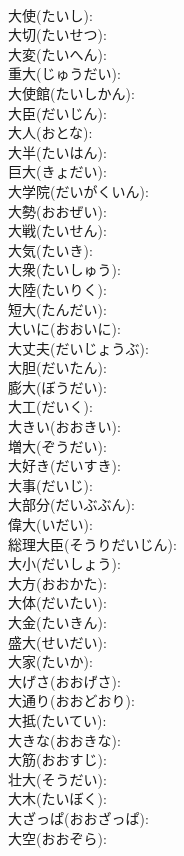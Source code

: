 \documentclass[8pt]{extreport}
\begin{document}
\begin{CJK}{UTF8}{min}
\\	大使(たいし): 
\\	大切(たいせつ): 
\\	大変(たいへん): 
\\	重大(じゅうだい): 
\\	大使館(たいしかん): 
\\	大臣(だいじん): 
\\	大人(おとな): 
\\	大半(たいはん): 
\\	巨大(きょだい): 
\\	大学院(だいがくいん): 
\\	大勢(おおぜい): 
\\	大戦(たいせん): 
\\	大気(たいき): 
\\	大衆(たいしゅう): 
\\	大陸(たいりく): 
\\	短大(たんだい): 
\\	大いに(おおいに): 
\\	大丈夫(だいじょうぶ): 
\\	大胆(だいたん): 
\\	膨大(ぼうだい): 
\\	大工(だいく): 
\\	大きい(おおきい): 
\\	増大(ぞうだい): 
\\	大好き(だいすき): 
\\	大事(だいじ): 
\\	大部分(だいぶぶん): 
\\	偉大(いだい): 
\\	総理大臣(そうりだいじん): 
\\	大小(だいしょう): 
\\	大方(おおかた): 
\\	大体(だいたい): 
\\	大金(たいきん): 
\\	盛大(せいだい): 
\\	大家(たいか): 
\\	大げさ(おおげさ): 
\\	大通り(おおどおり): 
\\	大抵(たいてい): 
\\	大きな(おおきな): 
\\	大筋(おおすじ): 
\\	壮大(そうだい): 
\\	大木(たいぼく): 
\\	大ざっぱ(おおざっぱ): 
\\	大空(おおぞら): 

\end{CJK}
\end{document}
